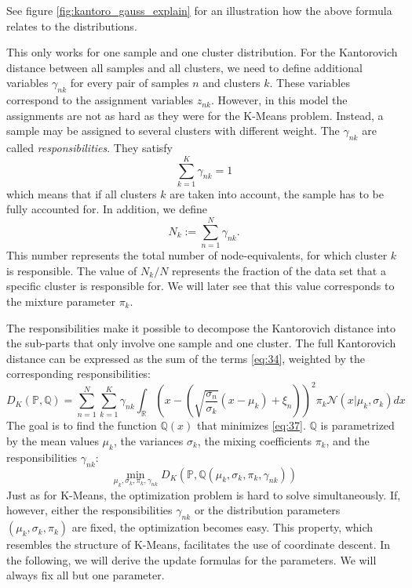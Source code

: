 See figure \ref{fig:kantoro_gauss_explain} for an illustration how the above formula relates to the distributions.

This only works for one sample and one cluster distribution.
For the Kantorovich distance between all samples and all clusters, we need to define additional variables $\gamma_{nk}$ for every pair of samples $n$ and clusters $k$.
These variables correspond to the assignment variables $z_{nk}$.
However, in this model the assignments are not as hard as they were for the K-Means problem.
Instead, a sample may be assigned to several clusters with different weight.
The $\gamma_{nk}$ are called \textit{responsibilities}.
They satisfy
\begin{equation}
  \label{eq:35}
  \sum_{k=1}^K\gamma_{nk} = 1
\end{equation}
which means that if all clusters $k$ are taken into account, the sample has to be fully accounted for.
In addition, we define
\begin{equation}
  \label{eq:36}
  N_k := \sum_{n=1}^N \gamma_{nk}.
\end{equation}
This number represents the total number of node-equivalents, for which cluster $k$ is responsible.
The value of $N_k/N$ represents the fraction of the data set that a specific cluster is responsible for.
We will later see that this value corresponds to the mixture parameter $\pi_k$.

The responsibilities make it possible to decompose the Kantorovich distance into the sub-parts that only involve one sample and one cluster.
The full Kantorovich distance can be expressed as the sum of the terms \eqref{eq:34}, weighted by the corresponding responsibilities:
\begin{equation}
  \label{eq:37}
  D_K(\mathbb{P,Q}) = \sum_{n=1}^N\sum_{k=1}^K\gamma_{nk}\int_\mathbb{R}\left(x-\left(\sqrt{\frac{\sigma_n}{\sigma_k}}(x-\mu_k)+\xi_n\right)\right)^2\pi_k\mathcal{N}(x|\mu_k,\sigma_k)dx
\end{equation}
The goal is to find the function $\mathbb{Q}(x)$ that minimizes \eqref{eq:37}.
$\mathbb{Q}$ is parametrized by the mean values $\mu_k$, the variances $\sigma_k$, the mixing coefficients $\pi_k$, and the responsibilities $\gamma_{nk}$:
\begin{equation}
  \label{eq:38}
  \min\limits_{\mu_k,\sigma_k,\pi_k, \gamma_{nk}}D_K(\mathbb{P,Q}(\mu_k,\sigma_k,\pi_k, \gamma_{nk}))
\end{equation}
Just as for K-Means, the optimization problem is hard to solve simultaneously.
If, however, either the responsibilities $\gamma_{nk}$ or the distribution parameters $(\mu_k, \sigma_k, \pi_k)$ are fixed, the optimization becomes easy.
This property, which resembles the structure of K-Means, facilitates the use of coordinate descent.
In the following, we will derive the update formulas for the parameters.
We will always fix all but one parameter.

